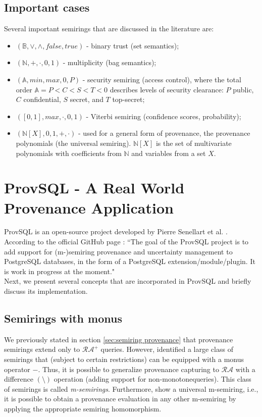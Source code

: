 \subsection{Important cases} Several important semirings that are discussed in the literature \cite{green2007provenance, Karvounarakis:2012:SDQ:2380776.2380778, Senellart2017} are:
\begin{itemize}
    \item $(\mathbb{B}, \vee, \wedge, false, true)$ - binary trust (set semantics);
    \item $(\mathbb{N}, +, \cdot, 0, 1)$ - multiplicity (bag semantics);
    \item $(\mathbb{A}, min, max, 0, P)$ - security semiring (access control), where the total order $\mathbb{A}=P<C<S<T<0$ describes levels of security clearance: $P$ public, $C$ confidential, $S$ secret, and $T$ top-secret;
    \item $([0,1], max, \cdot, 0, 1)$ - Viterbi semiring (confidence scores, probability);
    \item $(\mathbb{N}[X], 0, 1, +, \cdot)$ - used for a general form of provenance, the provenance polynomials (the universal semiring). $\mathbb{N}[X]$ is the set of multivariate polynomials with coefficients from $\mathbb{N}$ and variables from a set $X$.
\end{itemize}

\section{ProvSQL - A Real World Provenance Application}\label{sec:provsql}
ProvSQL is an open-source project developed by Pierre Senellart et al. \cite{Senellart2018}.
According to the official GitHub page \cite{provsql_github}:
``The goal of the ProvSQL project is to add support for (m-)semiring provenance and uncertainty management to PostgreSQL databases, in the form of a PostgreSQL extension/module/plugin. It is work in progress at the moment." \\
Next, we present several concepts that are incorporated in ProvSQL and briefly discuss its implementation.
\subsection{Semirings with monus} We previously stated in section \ref{sec:semiring provenance} that provenance semirings extend only to  $\mathcal{RA^+}$ queries. However, \cite{monus_k_relations} identified a large class of semirings that (subject to certain restrictions) can be equipped with a monus operator $-$. Thus, it is possible to generalize provenance capturing to $\mathcal{RA}$ with a difference $(\setminus)$ operation (adding support for non-monotone\footnotemark queries). 
This class of semirings is called \textit{m-semirings}. Furthermore, \cite{monus_k_relations} show a universal m-semiring, i.e., it is possible to obtain a provenance evaluation in any other m-semiring by applying the appropriate semiring homomorphism.
